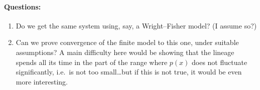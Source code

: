 \documentclass{article}
\begin{document}
\paragraph{Questions:} 
\begin{enumerate}

    \item Do we get the same system using, say, a Wright--Fisher model?  (I assume so?)

    \item Can we prove convergence of the finite model to this one, under suitable assumptions?  A main difficulty here would be showing that the lineage spends all its time in the part of the range where $p(x)$ does not fluctuate significantly, i.e.\ is not too small\ldots but if this is not true, it would be even more interesting.

\end{enumerate}
\end{document}
